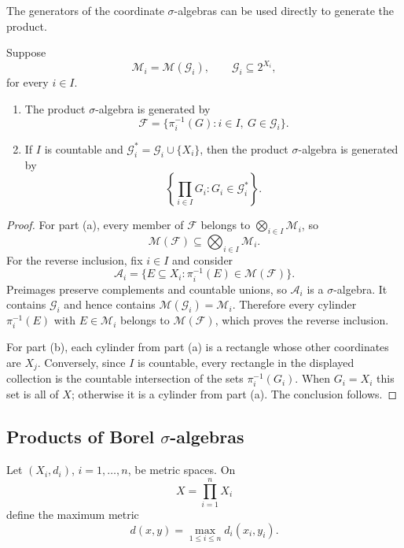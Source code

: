 The generators of the coordinate $\sigma$-algebras can be used directly
to generate the product.

\begin{proposition}\label{prop:product-generators}
  Suppose
  \[
    \mathcal M_i=\mathcal M(\mathcal G_i),
    \qquad
    \mathcal G_i\subseteq 2^{X_i},
  \]
  for every $i\in I$.
  \begin{enumerate}[label=(\alph*)]
    \item The product $\sigma$-algebra is generated by
      \[
        \mathcal F
        =\{\pi_i^{-1}(G):i\in I,\ G\in\mathcal G_i\}.
      \]
    \item If $I$ is countable and
      $\mathcal G_i^*=\mathcal G_i\cup\{X_i\}$, then the product
      $\sigma$-algebra is generated by
      \[
        \left\{\prod_{i\in I}G_i:G_i\in\mathcal G_i^*\right\}.
      \]
  \end{enumerate}
\end{proposition}

\begin{proof}
  For part (a), every member of $\mathcal F$ belongs to
  $\bigotimes_{i\in I}\mathcal M_i$, so
  \[
    \mathcal M(\mathcal F)
    \subseteq\bigotimes_{i\in I}\mathcal M_i.
  \]
  For the reverse inclusion, fix $i\in I$ and consider
  \[
    \mathcal A_i
    =\{E\subseteq X_i:\pi_i^{-1}(E)\in\mathcal M(\mathcal F)\}.
  \]
  Preimages preserve complements and countable unions, so
  $\mathcal A_i$ is a $\sigma$-algebra. It contains $\mathcal G_i$ and
  hence contains $\mathcal M(\mathcal G_i)=\mathcal M_i$. Therefore
  every cylinder $\pi_i^{-1}(E)$ with $E\in\mathcal M_i$ belongs to
  $\mathcal M(\mathcal F)$, which proves the reverse inclusion.

  For part (b), each cylinder from part (a) is a rectangle whose other
  coordinates are $X_j$. Conversely, since $I$ is countable, every
  rectangle in the displayed collection is the countable intersection
  of the sets $\pi_i^{-1}(G_i)$. When $G_i=X_i$ this set is all of $X$;
  otherwise it is a cylinder from part (a). The conclusion follows.
\end{proof}

\subsection{Products of Borel \texorpdfstring{$\sigma$}{sigma}-algebras}

Let $(X_i,d_i)$, $i=1,\ldots,n$, be metric spaces. On
\[
  X=\prod_{i=1}^n X_i
\]
define the maximum metric
\[
  d(x,y)=\max_{1\leq i\leq n}d_i(x_i,y_i).
\]

